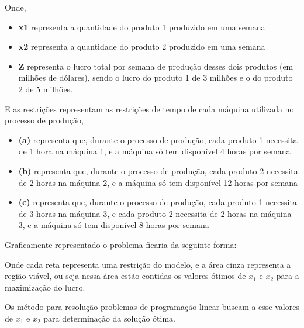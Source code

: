 Onde,
\begin{itemize}
\item \textbf {x1} representa a quantidade do produto 1 produzido em uma semana
\item \textbf {x2} representa a quantidade do produto 2 produzido em uma semana
\item \textbf {Z} representa o lucro total por semana de produção desses dois produtos (em milhões de dólares), sendo o lucro do produto 1 de 3 milhões e o do produto 2 de 5 milhões.
\end{itemize}

E as restrições representam as restrições de tempo de cada máquina utilizada no processo de produção,
\begin{itemize}
\item \textbf {(a)} representa que, durante o processo de produção, cada produto 1 necessita de 1 hora na máquina 1, e a máquina só tem disponível 4 horas por semana
\item \textbf {(b)} representa que, durante o processo de produção, cada produto 2 necessita de 2 horas na máquina 2, e a máquina só tem disponível 12 horas por semana
\item \textbf {(c)} representa que, durante o processo de produção, cada produto 1 necessita de 3 horas na máquina 3, e cada produto 2 necessita de 2 horas na máquina 3, e a máquina só tem disponível 8 horas por semana
\end{itemize}

Graficamente representado o problema ficaria da seguinte forma:
\begin{center}
\end{center}

Onde cada reta representa uma restrição do modelo, e a área cinza representa a região viável, ou seja nessa área estão contidas os valores ótimos de $x_{1}$ e $x_{2}$ para a maximização do lucro.

Os método para resolução problemas de programação linear buscam a esse valores de $x_{1}$ e $x_{2}$  para determinação da solução ótima.


